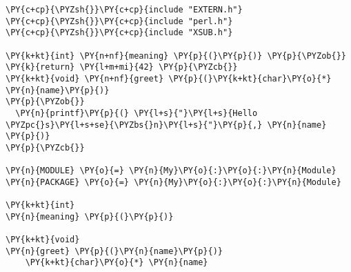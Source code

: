 \begin{Verbatim}[commandchars=\\\{\}]
\PY{c+cp}{\PYZsh{}}\PY{c+cp}{include "EXTERN.h"}
\PY{c+cp}{\PYZsh{}}\PY{c+cp}{include "perl.h"}
\PY{c+cp}{\PYZsh{}}\PY{c+cp}{include "XSUB.h"}

\PY{k+kt}{int} \PY{n+nf}{meaning} \PY{p}{(}\PY{p}{)} \PY{p}{\PYZob{}} \PY{k}{return} \PY{l+m+mi}{42} \PY{p}{\PYZcb{}}
\PY{k+kt}{void} \PY{n+nf}{greet} \PY{p}{(}\PY{k+kt}{char}\PY{o}{*} \PY{n}{name}\PY{p}{)} 
\PY{p}{\PYZob{}}
  \PY{n}{printf}\PY{p}{(} \PY{l+s}{"}\PY{l+s}{Hello \PYZpc{}s}\PY{l+s+se}{\PYZbs{}n}\PY{l+s}{"}\PY{p}{,} \PY{n}{name} \PY{p}{)} 
\PY{p}{\PYZcb{}}

\PY{n}{MODULE} \PY{o}{=} \PY{n}{My}\PY{o}{:}\PY{o}{:}\PY{n}{Module}    \PY{n}{PACKAGE} \PY{o}{=} \PY{n}{My}\PY{o}{:}\PY{o}{:}\PY{n}{Module}

\PY{k+kt}{int}
\PY{n}{meaning} \PY{p}{(}\PY{p}{)}

\PY{k+kt}{void}
\PY{n}{greet} \PY{p}{(}\PY{n}{name}\PY{p}{)}
    \PY{k+kt}{char}\PY{o}{*} \PY{n}{name}
\end{Verbatim}
